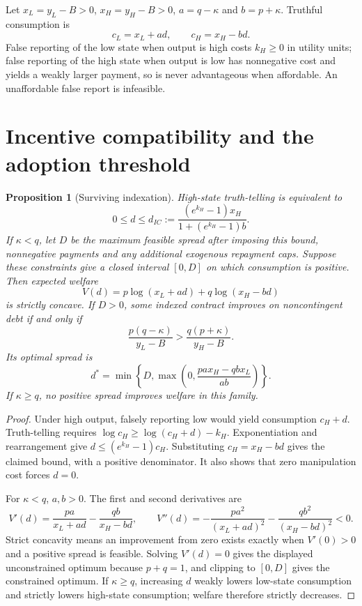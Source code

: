 \documentclass[11pt]{article}
\newtheorem{proposition}{Proposition}
\begin{document}
Let $x_L=y_L-B>0$, $x_H=y_H-B>0$, $a=q-\kappa$ and $b=p+\kappa$. Truthful consumption is
\[
 c_L=x_L+ad,\qquad c_H=x_H-bd.
\]
False reporting of the low state when output is high costs $k_H\geq0$ in utility units; false reporting of the high state when output is low has nonnegative cost and yields a weakly larger payment, so is never advantageous when affordable. An unaffordable false report is infeasible.

\section*{Incentive compatibility and the adoption threshold}
\begin{proposition}[Surviving indexation]
High-state truth-telling is equivalent to
\[
 0\leq d\leq d_{IC}:=
 \frac{(e^{k_H}-1)x_H}{1+(e^{k_H}-1)b}.
\]
If $\kappa<q$, let $D$ be the maximum feasible spread after imposing this bound, nonnegative payments and any additional exogenous repayment caps. Suppose these constraints give a closed interval $[0,D]$ on which consumption is positive. Then expected welfare
\[
 V(d)=p\log(x_L+ad)+q\log(x_H-bd)
\]
is strictly concave. If $D>0$, some indexed contract improves on noncontingent debt if and only if
\[
 \frac{p(q-\kappa)}{y_L-B}>
 \frac{q(p+\kappa)}{y_H-B}.
\]
Its optimal spread is
\[
 d^*=\min\left\{D,\max\left(0,
 \frac{p a x_H-q b x_L}{ab}\right)\right\}.
\]
If $\kappa\geq q$, no positive spread improves welfare in this family.
\end{proposition}
\begin{proof}
Under high output, falsely reporting low would yield consumption $c_H+d$. Truth-telling requires $\log c_H\geq\log(c_H+d)-k_H$. Exponentiation and rearrangement give $d\leq(e^{k_H}-1)c_H$. Substituting $c_H=x_H-bd$ gives the claimed bound, with a positive denominator. It also shows that zero manipulation cost forces $d=0$.

For $\kappa<q$, $a,b>0$. The first and second derivatives are
\[
 V'(d)=\frac{pa}{x_L+ad}-\frac{qb}{x_H-bd},\qquad
 V''(d)=-\frac{pa^2}{(x_L+ad)^2}-\frac{qb^2}{(x_H-bd)^2}<0.
\]
Strict concavity means an improvement from zero exists exactly when $V'(0)>0$ and a positive spread is feasible. Solving $V'(d)=0$ gives the displayed unconstrained optimum because $p+q=1$, and clipping to $[0,D]$ gives the constrained optimum. If $\kappa\geq q$, increasing $d$ weakly lowers low-state consumption and strictly lowers high-state consumption; welfare therefore strictly decreases.
\end{proof}
\end{document}
